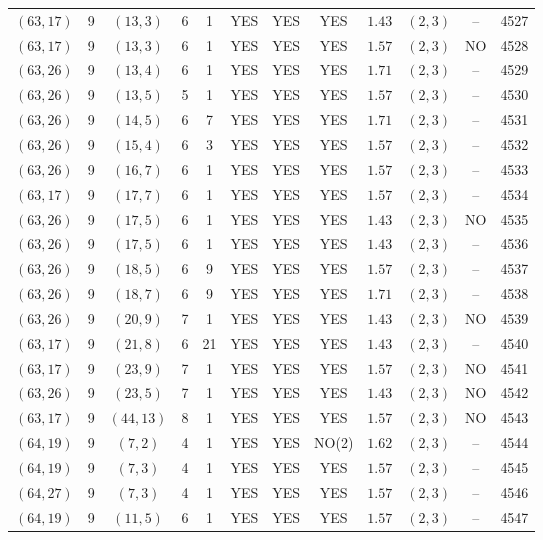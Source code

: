 \begin{longtable}{|c|c|c|c|c|c|c|c|c|c|c|c|}
$(63,17)$ & 9 & $(13,3)$ & 6 & 1 & YES & YES & YES & $1.43$ & $(2,3)$ & -- & 4527\\
$(63,17)$ & 9 & $(13,3)$ & 6 & 1 & YES & YES & YES & $1.57$ & $(2,3)$ & NO & 4528\\
$(63,26)$ & 9 & $(13,4)$ & 6 & 1 & YES & YES & YES & $1.71$ & $(2,3)$ & -- & 4529\\
$(63,26)$ & 9 & $(13,5)$ & 5 & 1 & YES & YES & YES & $1.57$ & $(2,3)$ & -- & 4530\\
$(63,26)$ & 9 & $(14,5)$ & 6 & 7 & YES & YES & YES & $1.71$ & $(2,3)$ & -- & 4531\\
$(63,26)$ & 9 & $(15,4)$ & 6 & 3 & YES & YES & YES & $1.57$ & $(2,3)$ & -- & 4532\\
$(63,26)$ & 9 & $(16,7)$ & 6 & 1 & YES & YES & YES & $1.57$ & $(2,3)$ & -- & 4533\\
$(63,17)$ & 9 & $(17,7)$ & 6 & 1 & YES & YES & YES & $1.57$ & $(2,3)$ & -- & 4534\\
$(63,26)$ & 9 & $(17,5)$ & 6 & 1 & YES & YES & YES & $1.43$ & $(2,3)$ & NO & 4535\\
$(63,26)$ & 9 & $(17,5)$ & 6 & 1 & YES & YES & YES & $1.43$ & $(2,3)$ & -- & 4536\\
$(63,26)$ & 9 & $(18,5)$ & 6 & 9 & YES & YES & YES & $1.57$ & $(2,3)$ & -- & 4537\\
$(63,26)$ & 9 & $(18,7)$ & 6 & 9 & YES & YES & YES & $1.71$ & $(2,3)$ & -- & 4538\\
$(63,26)$ & 9 & $(20,9)$ & 7 & 1 & YES & YES & YES & $1.43$ & $(2,3)$ & NO & 4539\\
$(63,17)$ & 9 & $(21,8)$ & 6 & 21 & YES & YES & YES & $1.43$ & $(2,3)$ & -- & 4540\\
$(63,17)$ & 9 & $(23,9)$ & 7 & 1 & YES & YES & YES & $1.57$ & $(2,3)$ & NO & 4541\\
$(63,26)$ & 9 & $(23,5)$ & 7 & 1 & YES & YES & YES & $1.43$ & $(2,3)$ & NO & 4542\\
$(63,17)$ & 9 & $(44,13)$ & 8 & 1 & YES & YES & YES & $1.57$ & $(2,3)$ & NO & 4543\\
$(64,19)$ & 9 & $(7,2)$ & 4 & 1 & YES & YES & NO(2) & $1.62$ & $(2,3)$ & -- & 4544\\
$(64,19)$ & 9 & $(7,3)$ & 4 & 1 & YES & YES & YES & $1.57$ & $(2,3)$ & -- & 4545\\
$(64,27)$ & 9 & $(7,3)$ & 4 & 1 & YES & YES & YES & $1.57$ & $(2,3)$ & -- & 4546\\
$(64,19)$ & 9 & $(11,5)$ & 6 & 1 & YES & YES & YES & $1.57$ & $(2,3)$ & -- & 4547\\

\end{longtable}
